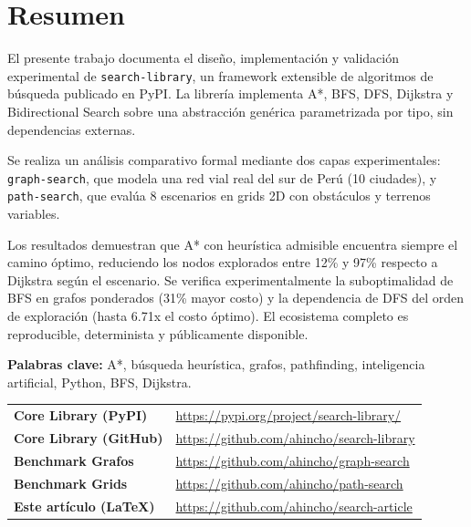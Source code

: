 \section*{Resumen}

El presente trabajo documenta el dise\~no, implementaci\'on y validaci\'on experimental de \texttt{search-library}, un framework extensible de algoritmos de b\'usqueda publicado en PyPI. La librer\'ia implementa A*, BFS, DFS, Dijkstra y Bidirectional Search sobre una abstracci\'on gen\'erica parametrizada por tipo, sin dependencias externas.

Se realiza un an\'alisis comparativo formal mediante dos capas experimentales: \texttt{graph-search}, que modela una red vial real del sur de Per\'u (10 ciudades), y \texttt{path-search}, que eval\'ua 8 escenarios en grids 2D con obst\'aculos y terrenos variables.

Los resultados demuestran que A* con heur\'istica admisible encuentra siempre el camino \'optimo, reduciendo los nodos explorados entre 12\% y 97\% respecto a Dijkstra seg\'un el escenario. Se verifica experimentalmente la suboptimalidad de BFS en grafos ponderados (31\% mayor costo) y la dependencia de DFS del orden de exploraci\'on (hasta 6.71x el costo \'optimo). El ecosistema completo es reproducible, determinista y p\'ublicamente disponible.

\textbf{Palabras clave:} A*, b\'usqueda heur\'istica, grafos, pathfinding, inteligencia artificial, Python, BFS, Dijkstra.

\newpage

\begin{tcolorbox}[title=Repositorios y recursos del proyecto, breakable, colback=blue!2, colframe=blue!40!black]
\renewcommand{\arraystretch}{1.4}
\begin{tabular}{@{} >{\bfseries}l l @{}}
    Core Library (PyPI) & \url{https://pypi.org/project/search-library/} \\
    Core Library (GitHub) & \url{https://github.com/ahincho/search-library} \\
    Benchmark Grafos & \url{https://github.com/ahincho/graph-search} \\
    Benchmark Grids & \url{https://github.com/ahincho/path-search} \\
    Este art\'iculo (LaTeX) & \url{https://github.com/ahincho/search-article} \\
\end{tabular}
\end{tcolorbox}










\newpage




